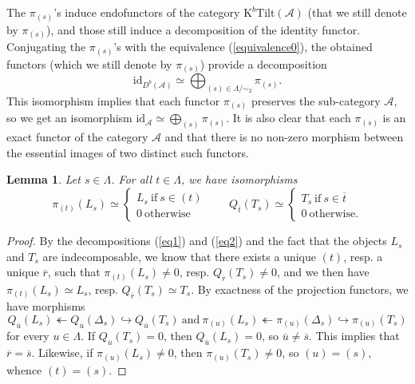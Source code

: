 \documentclass[11pt]{amsart}
\theoremstyle{plain}
\newtheorem{lem}[thm]{Lemma}
\theoremstyle{remark}
\numberwithin{equation}{section}
\begin{document}
	The $\pi_{(s)}$'s induce endofunctors of the category $\mathrm{K}^b\mathrm{Tilt}(\mathcal{A})$ (that we still denote by $\pi_{(s)}$), and those still induce a decomposition of the identity functor. Conjugating the $\pi_{(s)}$'s with the equivalence (\ref{equivalence0}), the obtained functors  (which we still denote by $\pi_{(s)}$) provide a decomposition 
	\begin{equation}\label{eq2}
		\mathrm{id}_{D^b(\mathcal{A})}\simeq\bigoplus_{(s)\in\Lambda/\sim_2}\pi_{(s)}.
	\end{equation}	
	This isomorphism implies that each functor $\pi_{(s)}$ preserves the sub-category $\mathcal{A}$, so we get an isomorphism $\mathrm{id}_{\mathcal{A}}\simeq\bigoplus_{(s)}\pi_{(s)}$. It is also clear that each $\pi_{(s)}$ is an exact functor of the category $\mathcal{A}$ and that there is no non-zero morphism between the essential images of two distinct such functors.
	\begin{lem}\label{lem1}
		Let $s\in\Lambda$. For all $t\in\Lambda$, we have isomorphisms
		$$\pi_{(t)}(L_s) \simeq\left\{
		\begin{array}{ll}
			L_s~\text{if}~s\in(t)\\
			0~\text{otherwise}
		\end{array}
		\right.
		\qquad Q_{\overline{t}}(T_s) \simeq\left\{
		\begin{array}{ll}
			T_s~\text{if}~s\in\overline{t}\\
			0~\text{otherwise}.
		\end{array}
		\right.
		$$
	\end{lem}
	\begin{proof}
		By the decompositions (\ref{eq1}) and (\ref{eq2}) and the fact that the objects $L_s$ and $T_s$ are indecomposable, we know that there exists a unique $(t)$, resp. a unique $\overline{r}$, such that $\pi_{(t)}(L_s)\neq0$, resp. $Q_{\overline{r}}(T_s)\neq0$, and we then have $\pi_{(t)}(L_s)\simeq L_s$, resp. $Q_{\overline{r}}(T_s)\simeq T_s$. By exactness of the projection functors, we have morphisms
		$$ Q_{\overline{u}}(L_s) \twoheadleftarrow Q_{\overline{u}}(\Delta_s)\hookrightarrow Q_{\overline{u}}(T_s)~\text{and}~ \pi_{(u)}(L_s)\twoheadleftarrow \pi_{(u)}(\Delta_s) \hookrightarrow\pi_{(u)}(T_s)$$
		for every $u\in\Lambda$. If $Q_{\overline{u}}(T_s)=0$, then $Q_{\overline{u}}(L_s)=0$, so $\overline{u}\neq \overline{s}$. This implies that $\overline{r}= \overline{s}$. Likewise, if $\pi_{(u)}(L_s)\neq0$, then $\pi_{(u)}(T_s)\neq0$, so $(u)=(s)$, whence $(t)= (s)$.
	\end{proof}
	
\end{document}

